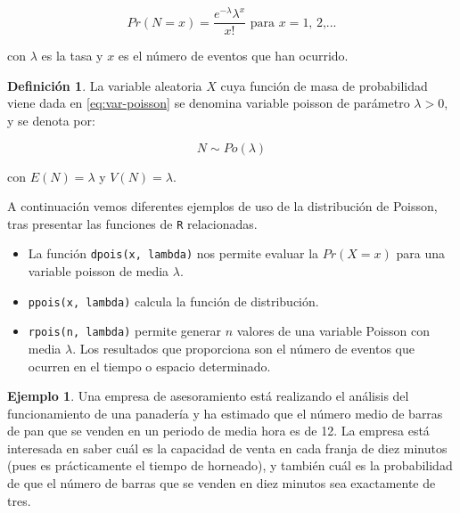 \documentclass[
]{book}
\providecommand{\tightlist}{%
  \setlength{\itemsep}{0pt}\setlength{\parskip}{0pt}}
\newenvironment{yellowbox}{
  \definecolor{shadecolor}{rgb}{210, 180, 140}  
  \color{black}
  \begin{shaded}}
 {\end{shaded}}
\newenvironment{whitebox}{
  \definecolor{shadecolor}{rgb}{255, 255, 255}  
  \color{black}
  \begin{shaded}}
 {\end{shaded}}
\theoremstyle{definition}
\newtheorem{definition}{Definición}[chapter]
\theoremstyle{definition}
\newtheorem{example}{Ejemplo}[chapter]
\theoremstyle{definition}
\theoremstyle{definition}
\theoremstyle{remark}
\begin{document}
\begin{equation}
Pr(N = x) = \frac{e^{-\lambda}\lambda^x}{x!}  \text{ para } x = \text{1, 2,...}
\label{eq:var-poisson}
\end{equation}

con \(\lambda\) es la tasa y \(x\) es el número de eventos que han ocurrido.

\begin{yellowbox}

\begin{definition}
\protect\hypertarget{def:vpoisson}{}{\label{def:vpoisson} }La variable aleatoria \(X\) cuya función de masa de probabilidad viene dada en \eqref{eq:var-poisson} se denomina variable poisson de parámetro \(\lambda > 0\), y se denota por:

\[N \sim Po(\lambda)\]

con \(E(N) = \lambda\) y \(V(N) = \lambda.\)\\
\end{definition}

\end{yellowbox}

A continuación vemos diferentes ejemplos de uso de la distribución de Poisson, tras presentar las funciones de \texttt{R} relacionadas.

\begin{whitebox}

\begin{itemize}
\tightlist
\item
  La función \texttt{dpois(x,\ lambda)} nos permite evaluar la \(Pr(X=x)\) para una variable poisson de media \(\lambda\).
\item
  \texttt{ppois(x,\ lambda)} calcula la función de distribución.
\item
  \texttt{rpois(n,\ lambda)} permite generar \(n\) valores de una variable Poisson con media \(\lambda\). Los resultados que proporciona son el número de eventos que ocurren en el tiempo o espacio determinado.
\end{itemize}

\end{whitebox}

\begin{example}
\protect\hypertarget{exm:poisson01}{}\label{exm:poisson01}Una empresa de asesoramiento está realizando el análisis del funcionamiento de una panadería y ha estimado que el número medio de barras de pan que se venden en un periodo de media hora es de 12. La empresa está interesada en saber cuál es la capacidad de venta en cada franja de diez minutos (pues es prácticamente el tiempo de horneado), y también cuál es la probabilidad de que el número de barras que se venden en diez minutos sea exactamente de tres.
\end{example}
\end{document}
